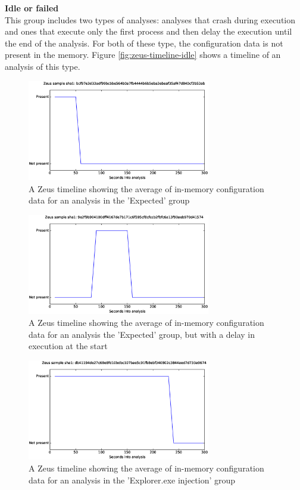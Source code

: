 \documentclass[conference]{IEEEtran}
\begin{document}
\textbf{Idle or failed}
\\This group includes two types of analyses: analyses that crash during execution and ones that execute only the first process and then delay the execution until the end of the analysis. For both of these type, the configuration data is not present in the memory. Figure \ref{fig:zeus-timeline-idle} shows a timeline of an analysis of this type.


\begin{figure}[h]
    \includegraphics[width=8cm,scale=0.5]{images/zeus/zeus-timelines-eps/Zeus-bcf97e3d33adf99bcbbe564b0a7fb4444b6b5eba3ebeaf35af47d840cf2b53ab.eps}
    \caption{A Zeus timeline showing the average of in-memory configuration data for an analysis in the 'Expected' group}
    \label{fig:zeus-timeline-normal}
\end{figure}
\begin{figure}[h]
    \includegraphics[width=8cm,scale=0.5]{images/zeus/zeus-timelines-eps/Zeus-9e2f9b904100dff4167de7b171c6f595cf8cfccb2fbfc6a13f90aeb970d41574.eps}
    \caption{A Zeus timeline showing the average of in-memory configuration data for an analysis the 'Expected' group, but with a delay in execution at the start}
    \label{fig:zeus-timeline-normal-delay}
\end{figure}
\begin{figure}[h]
    \includegraphics[width=8cm,scale=0.5]{images/zeus/zeus-timelines-eps/Zeus-db41194de27c68e8fd10bdbc107bae5c91fb8ebf340802c3844aed7d733a9674.eps}
    \caption{A Zeus timeline showing the average of in-memory configuration data for an analysis in the
    'Explorer.exe injection' group}
    \label{fig:zeus-timeline-injection}
\end{figure}
\end{document}
